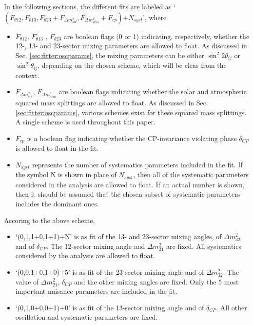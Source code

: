 In the following sections, the different fits are labeled as 
`$(F_{\theta12},F_{\theta13},F_{\theta23}+F_{{\Delta}m^2_{sol}},F_{{\Delta}m^2_{atm}}+F_{cp})$+$N_{syst}$', 
where
\begin{itemize}
\item
$F_{\theta12}$, $F_{\theta13}$ , $F_{\theta23}$ are boolean flags (0 or 1) indicating, respectively, whether the 12-, 13- and 23-sector
mixing parameters are allowed to float. As discussed in Sec. \ref{sec:fitter:oscparams}, the mixing parameters can be either
$\sin^{2}2\theta_{ij}$ or  $\sin^{2}\theta_{ij}$, depending on the chosen scheme, which will be clear from the context.
\item
$F_{{\Delta}m^2_{sol}}$, $F_{{\Delta}m^2_{atm}}$ are boolean flags indicating whether the solar and atmospheric squared mass splittings
are allowed to float. As discussed in Sec. \ref{sec:fitter:oscparams}, various schemes exist for these squared mass splittings.
A single scheme is used throughout this paper.
\item
$F_{cp}$ is a  boolean flag indicating whether the CP-invariance violating phase $\delta_{CP}$ is allowed to float in the fit.
\item
$N_{syst}$ represents the number of systematics parameters included in the fit.
If the symbol N is shown in place of $N_{syst}$, then all of the systematic parameters considered in the analysis are allowed to float.
If an actual number is shown, then it should be assumed that the chosen subset of systematic parameters includes the 
dominant ones.
\end{itemize}

Accoring to the above scheme, 
\begin{itemize}
\item
`(0,1,1+0,1+1)+N' is as fit of the 13- and 23-sector mixing angles, of ${\Delta}m^2_{32}$ and of $\delta_{CP}$. The 12-sector
mixing angle and ${\Delta}m^2_{21}$ are fixed. All systematics considered by the analysis are allowed to float.
\item
`(0,0,1+0,1+0)+5' is as fit of the 23-sector mixing angle and of  ${\Delta}m^2_{32}$. The value of ${\Delta}m^2_{21}$,
$\delta_{CP}$ and the other mixing angles are fixed. Only the 5 most important nuisance parameters are included in the fit.
\item
`(0,1,0+0,0+1)+0'  is as fit of the 13-sector  mixing angle and of $\delta_{CP}$. All other oscillation and systematic 
parameters are fixed.
\end{itemize}

